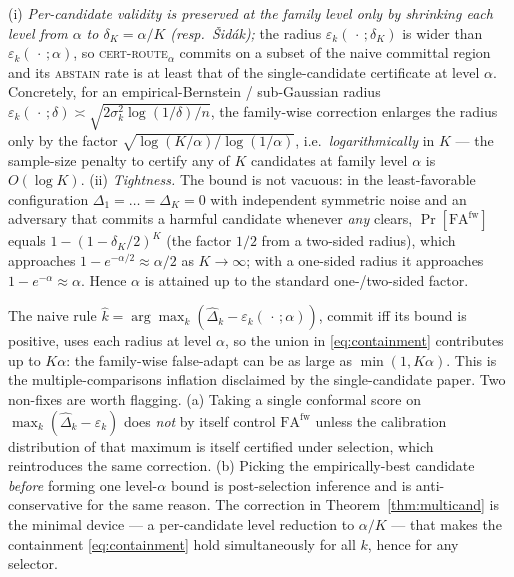 \begin{corollary}\label{cor:multicand-price}
\textnormal{(i)} \emph{Per-candidate validity is preserved at the family level only by
shrinking each level from $\alpha$ to $\delta_K=\alpha/K$ (resp.\ \v Sid\'ak);} the radius
$\varepsilon_k(\,\cdot\,;\delta_K)$ is wider than $\varepsilon_k(\,\cdot\,;\alpha)$, so
\textsc{cert-route}$_\alpha$ commits on a subset of the naive committal region and its
\textsc{abstain} rate is at least that of the single-candidate certificate at level $\alpha$.
Concretely, for an empirical-Bernstein / sub-Gaussian radius
$\varepsilon_k(\,\cdot\,;\delta)\asymp\sqrt{2\sigma_k^2\log(1/\delta)/n}$, the family-wise
correction enlarges the radius only by the factor $\sqrt{\log(K/\alpha)/\log(1/\alpha)}$,
i.e.\ \emph{logarithmically} in $K$ --- the sample-size penalty to certify any of $K$
candidates at family level $\alpha$ is $O(\log K)$.
\textnormal{(ii)} \emph{Tightness.} The bound is not vacuous: in the least-favorable
configuration $\Delta_1=\dots=\Delta_K=0$ with independent symmetric noise and an adversary
that commits a harmful candidate whenever \emph{any} clears, $\Pr[\mathrm{FA}^{\mathrm{fw}}]$
equals $1-(1-\delta_K/2)^{K}$ (the factor $1/2$ from a two-sided radius), which approaches
$1-e^{-\alpha/2}\approx\alpha/2$ as $K\to\infty$; with a one-sided radius it approaches
$1-e^{-\alpha}\approx\alpha$. Hence $\alpha$ is
attained up to the standard one-/two-sided factor.
\end{corollary}

\begin{remark}\label{rem:naive-fail}
The naive rule $\hat k=\arg\max_k(\hat\Delta_k-\varepsilon_k(\,\cdot\,;\alpha))$, commit iff
its bound is positive, uses each radius at level $\alpha$, so the union in
\eqref{eq:containment} contributes up to $K\alpha$: the family-wise false-adapt can be as
large as $\min(1,K\alpha)$. This is the multiple-comparisons inflation disclaimed by the
single-candidate paper. Two non-fixes are worth flagging. (a) Taking a single conformal
score on $\max_k(\hat\Delta_k-\varepsilon_k)$ does \emph{not} by itself control
$\mathrm{FA}^{\mathrm{fw}}$ unless the calibration distribution of that maximum is itself
certified under selection, which reintroduces the same correction. (b) Picking the
empirically-best candidate \emph{before} forming one level-$\alpha$ bound is post-selection
inference and is anti-conservative for the same reason. The correction in
Theorem~\ref{thm:multicand} is the minimal device --- a per-candidate level reduction to
$\alpha/K$ --- that makes the containment \eqref{eq:containment} hold simultaneously for all
$k$, hence for any selector.
\end{remark}

